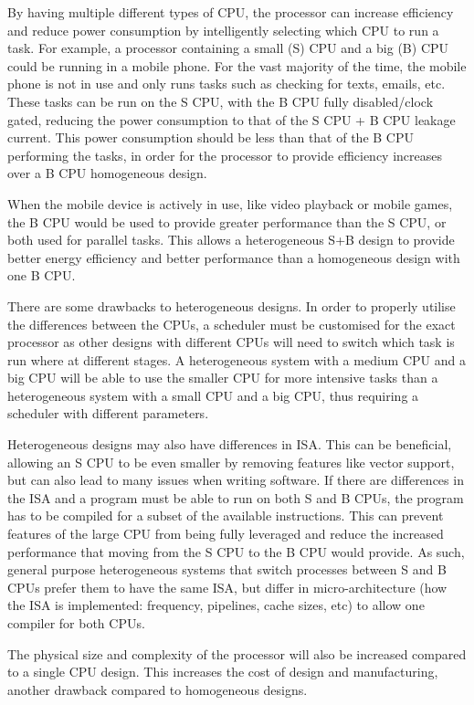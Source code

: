 By having multiple different types of CPU, the processor can increase efficiency and reduce power consumption by intelligently selecting which CPU to run a task. For example, a processor containing a small (S) CPU and a big (B) CPU could be running in a mobile phone. For the vast majority of the time, the mobile phone is not in use and only runs tasks such as checking for texts, emails, etc. These tasks can be run on the S CPU, with the B CPU fully disabled/clock gated, reducing the power consumption to that of the S CPU + B CPU leakage current. This power consumption should be less than that of the B CPU performing the tasks, in order for the processor to provide efficiency increases over a B CPU homogeneous design.

When the mobile device is actively in use, like video playback or mobile games, the B CPU would be used to provide greater performance than the S CPU, or both used for parallel tasks. This allows a heterogeneous S+B design to provide better energy efficiency and better performance than a homogeneous design with one B CPU.

There are some drawbacks to heterogeneous designs. In order to properly utilise the differences between the CPUs, a scheduler must be customised for the exact processor as other designs with different CPUs will need to switch which task is run where at different stages. A heterogeneous system with a medium CPU and a big CPU will be able to use the smaller CPU for more intensive tasks than a heterogeneous system with a small CPU and a big CPU, thus requiring a scheduler with different parameters.

Heterogeneous designs may also have differences in ISA. This can be beneficial, allowing an S CPU to be even smaller by removing features like vector support, but can also lead to many issues when writing software. If there are differences in the ISA and a program must be able to run on both S and B CPUs, the program has to be compiled for a subset of the available instructions. This can prevent features of the large CPU from being fully leveraged and reduce the increased performance that moving from the S CPU to the B CPU would provide. As such, general purpose heterogeneous systems that switch processes between S and B CPUs prefer them to have the same ISA, but differ in micro-architecture (how the ISA is implemented: frequency, pipelines, cache sizes, etc) to allow one compiler for both CPUs.

The physical size and complexity of the processor will also be increased compared to a single CPU design. This increases the cost of design and manufacturing, another drawback compared to homogeneous designs.

